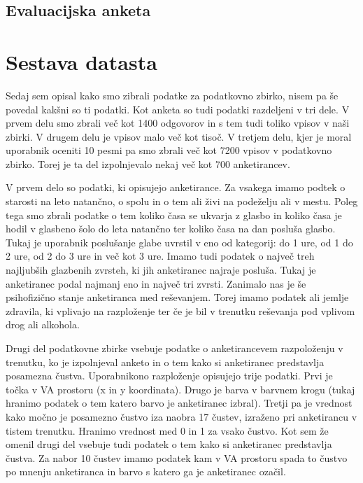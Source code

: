 \documentclass[a4paper, 12pt]{book}
\begin{document}
{\begin{figure}[hbt]
\caption{}
\label{moodgraphdvo}
\end{figure}

\subsection{Evaluacijska anketa}

\section{Sestava datasta}

Sedaj sem opisal kako smo zibrali podatke za podatkovno zbirko, nisem pa še povedal kakšni so ti podatki. Kot anketa so tudi podatki razdeljeni v tri dele. V prvem delu smo zbrali več kot 1400 odgovorov in s tem tudi toliko vpisov v naši zbirki. V drugem delu je vpisov malo več kot tisoč. V tretjem delu, kjer je moral uporabnik oceniti 10 pesmi pa smo zbrali več kot 7200 vpisov v podatkovno zbirko. Torej je ta del izpolnjevalo nekaj več kot 700 anketirancev.

V prvem delo so podatki, ki opisujejo anketirance. Za vsakega imamo podtek o starosti na leto natančno, o spolu in o tem ali živi na podeželju ali v mestu. Poleg tega smo zbrali podatke o tem koliko časa se ukvarja z glasbo in koliko časa je hodil v glasbeno šolo do leta natančno ter koliko časa na dan posluša glasbo. Tukaj je uporabnik poslušanje glabe uvrstil v eno od kategorij: do 1 ure, od 1 do 2 ure, od 2 do 3 ure in več kot 3 ure. Imamo tudi podatek o največ treh najljubših glazbenih zvrsteh, ki jih anketiranec najraje posluša. Tukaj je anketiranec podal najmanj eno in največ tri zvrsti. Zanimalo nas je še psihofizično stanje anketiranca med reševanjem. Torej imamo podatek ali jemlje zdravila, ki vplivajo na razploženje ter če je bil v trenutku reševanja pod vplivom drog ali alkohola. 

Drugi del podatkovne zbirke vsebuje podatke o anketirancevem razpoloženju v trenutku, ko je izpolnjeval anketo in o tem kako si anketiranec predstavlja posamezna čustva. Uporabnikono razploženje opisujejo trije podatki. Prvi je točka v VA prostoru (x in y koordinata). Drugo je barva v barvnem krogu (tukaj hranimo podatek o tem katero barvo je  anketiranec izbral). Tretji pa je vrednost kako močno je posamezno čustvo iza naobra 17 čustev, izraženo pri anketirancu v tistem trenutku. Hranimo vrednost med 0 in 1 za vsako čustvo. Kot sem že omenil drugi del vsebuje tudi podatek o tem kako si anketiranec predstavlja čustva. Za nabor 10 čustev imamo podatek kam v VA prostoru spada to čustvo po mnenju anketiranca in barvo s katero ga je anketiranec ozačil. 

}
\end{document}
